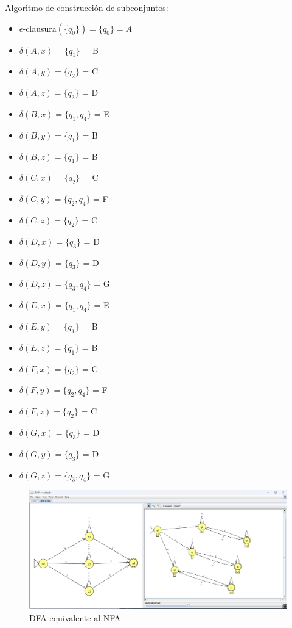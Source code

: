 \documentclass[11pt]{report}
\begin{document}
Algoritmo de construcción de subconjuntos:
\begin{multicols}{2}
  \begin{itemize}
    \item $\epsilon$-clausura$(\{q_0\}) = \{q_0\} = A$
    \item $\delta(A, x) = \{q_1\}$ = B
    \item $\delta(A, y) = \{q_2\}$ = C
    \item $\delta(A, z) = \{q_3\}$ = D
    \item $\delta(B, x) = \{q_1, q_4\}$ = E
    \item $\delta(B, y) = \{q_1\}$ = B
    \item $\delta(B, z) = \{q_1\}$ = B
    \item $\delta(C, x) = \{q_2\}$ = C
    \item $\delta(C, y) = \{q_2, q_4\}$ = F
    \item $\delta(C, z) = \{q_2\}$ = C
    \item $\delta(D, x) = \{q_3\}$ = D
  \end{itemize}

  \columnbreak

  \begin{itemize}
    \item $\delta(D, y) = \{q_3\}$ = D
    \item $\delta(D, z) = \{q_3, q_4\}$ = G
    \item $\delta(E, x) = \{q_1, q_4\}$ = E
    \item $\delta(E, y) = \{q_1\}$ = B
    \item $\delta(E, z) = \{q_1\}$ = B
    \item $\delta(F, x) = \{q_2\}$ = C
    \item $\delta(F, y) = \{q_2, q_4\}$ = F
    \item $\delta(F, z) = \{q_2\}$ = C
    \item $\delta(G, x) = \{q_3\}$ = D
    \item $\delta(G, y) = \{q_3\}$ = D
    \item $\delta(G, z) = \{q_3, q_4\}$ = G
  \end{itemize}
\end{multicols}

\begin{figure}[H]
  \centering
  \includegraphics[scale=0.4]{img/NFA_to_DFA_07.png}
  \caption{DFA equivalente al NFA}
\end{figure}
\end{document}
